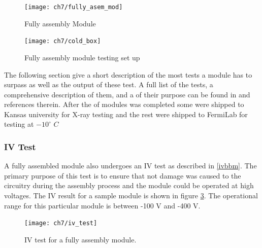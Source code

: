 \begin{figure}[!h]
	\centering
	\texttt{[image: ch7/fully\_asem\_mod]}
	\caption[Fully assembly Module]{Fully assembly Module}
	\label{fig:fully_asem_mod}
\end{figure}

\begin{figure}[!h]
	\centering
	\texttt{[image: ch7/cold\_box]}
	\caption[Testing set up]{Fully assembly module testing set up}
	\label{cold_box}
\end{figure}

The following section {} give a short description of the most  tests a module has to surpass as well as the output of these test. A full list of the tests, a comprehensive description of them, and a {} of their purpose can be found in \cite{fpix_module_testing_guide} and references therein. After the  of modules was completed some were shipped to Kansas university for X-ray testing and the rest were shipped to FermiLab for testing at $-10^{\circ}$ $C$

\subsubsection{IV Test}
A fully assembled module also undergoes an IV test as described in \ref{ivbbm}. The primary purpose of this test is to ensure that not damage was caused to the circuitry during the assembly process and the module could be operated at high voltages. The IV result for a sample module is shown in figure \ref{ivfullmod}. The operational range for this particular module is between -100 V and -400 V.

\begin{figure}[!h]
	\centering
	\texttt{[image: ch7/iv\_test]}
  	\caption[IV results of a module]{IV test for a fully assembly module.}
  	\label{ivfullmod}
\end{figure}

